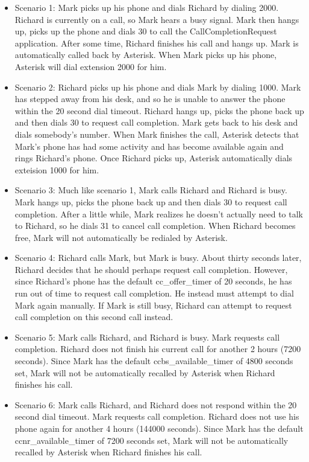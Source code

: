 \begin{itemize}
\item Scenario 1:
Mark picks up his phone and dials Richard by dialing 2000. Richard is
currently on a call, so Mark hears a busy signal. Mark then hangs up,
picks up the phone and dials 30 to call the CallCompletionRequest
application. After some time, Richard finishes his call and hangs up.
Mark is automatically called back by Asterisk. When Mark picks up his
phone, Asterisk will dial extension 2000 for him.

\item Scenario 2:
Richard picks up his phone and dials Mark by dialing 1000. Mark has stepped
away from his desk, and so he is unable to answer the phone within the
20 second dial timeout. Richard hangs up, picks the phone back up and then
dials 30 to request call completion. Mark gets back to his desk and dials
somebody's number. When Mark finishes the call, Asterisk detects that Mark's
phone has had some activity and has become available again and rings Richard's
phone. Once Richard picks up, Asterisk automatically dials exteision 1000 for
him.

\item Scenario 3:
Much like scenario 1, Mark calls Richard and Richard is busy. Mark hangs up,
picks the phone back up and then dials 30 to request call completion. After
a little while, Mark realizes he doesn't actually need to talk to Richard, so
he dials 31 to cancel call completion. When Richard becomes free, Mark will
not automatically be redialed by Asterisk.

\item Scenario 4:
Richard calls Mark, but Mark is busy. About thirty seconds later, Richard decides
that he should perhaps request call completion. However, since Richard's phone
has the default cc\_offer\_timer of 20 seconds, he has run out of time to
request call completion. He instead must attempt to dial Mark again manually. If
Mark is still busy, Richard can attempt to request call completion on this second
call instead.

\item Scenario 5:
Mark calls Richard, and Richard is busy. Mark requests call completion. Richard
does not finish his current call for another 2 hours (7200 seconds). Since Mark
has the default ccbs\_available\_timer of 4800 seconds set, Mark will not be
automatically recalled by Asterisk when Richard finishes his call.

\item Scenario 6:
Mark calls Richard, and Richard does not respond within the 20 second dial timeout.
Mark requests call completion. Richard does not use his phone again for another
4 hours (144000 seconds). Since Mark has the default ccnr\_available\_timer
of 7200 seconds set, Mark will not be automatically recalled by Asterisk when
Richard finishes his call.
\end{itemize}
